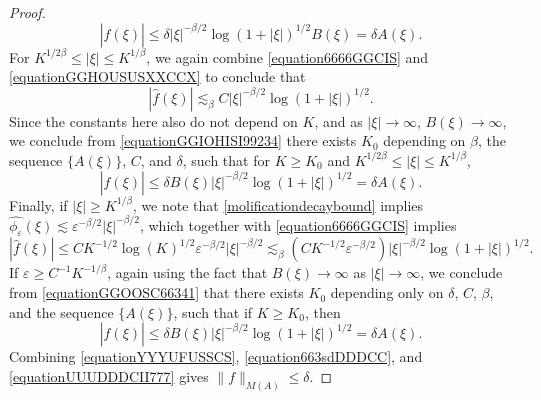 \documentclass[12pt,reqno]{article}
\numberwithin{equation}{section}
\begin{document}
\begin{proof}
    \begin{equation} \label{equationYYYUFUSSCS}
        |\widehat{f}(\xi)| \leq \delta |\xi|^{-\beta/2} \log(1 + |\xi|)^{1/2} B(\xi) = \delta A(\xi).
    \end{equation}
    For $K^{1/2\beta} \leq |\xi| \leq K^{1/\beta}$, we again combine \eqref{equation6666GGCIS} and \eqref{equationGGHOUSUSXXCCX} to conclude that
    \begin{equation} \label{equationGGIOHISI99234}
        |\widehat{f}(\xi)| \lesssim_\beta C |\xi|^{-\beta/2} \log(1 + |\xi|)^{1/2}.
    \end{equation}
    Since the constants here also do not depend on $K$, and as $|\xi | \to \infty$, $B(\xi) \to \infty$, we conclude from \eqref{equationGGIOHISI99234} there exists $K_0$ depending on $\beta$, the sequence $\{ A(\xi) \}$, $C$, and $\delta$, such that for $K \geq K_0$ and $K^{1/2\beta} \leq |\xi| \leq K^{1/\beta}$,
    \begin{equation} \label{equation663sdDDDCC}
        |\widehat{f}(\xi)| \leq \delta B(\xi) |\xi|^{-\beta/2} \log(1 + |\xi|)^{1/2} = \delta A(\xi).
    \end{equation}
    Finally, if $|\xi| \geq K^{1/\beta}$, we note that \eqref{molificationdecaybound} implies $\widehat{\phi_\varepsilon}(\xi) \lesssim \varepsilon^{-\beta/2} |\xi|^{-\beta/2}$, which together with \eqref{equation6666GGCIS} implies
    \begin{equation} \label{equationGGOOSC66341}
        |\widehat{f}(\xi)| \leq C K^{-1/2} \log(K)^{1/2} \varepsilon^{-\beta/2} |\xi|^{-\beta/2} \lesssim_\beta \left( C K^{-1/2} \varepsilon^{-\beta/2} \right) |\xi|^{-\beta/2} \log(1 + |\xi|)^{1/2}.
    \end{equation}
    If $\varepsilon \geq C^{-1} K^{-1/\beta}$, again using the fact that $B(\xi) \to \infty$ as $|\xi| \to \infty$, we conclude from \eqref{equationGGOOSC66341} that there exists $K_0$ depending only on $\delta$, $C$, $\beta$, and the sequence $\{ A(\xi) \}$, such that if $K \geq K_0$, then
    \begin{equation} \label{equationUUUDDDCII777}
        |\widehat{f}(\xi)| \leq \delta B(\xi) |\xi|^{-\beta/2} \log(1 + |\xi|)^{1/2} = \delta A(\xi).
    \end{equation}
    Combining \eqref{equationYYYUFUSSCS}, \eqref{equation663sdDDDCC}, and \eqref{equationUUUDDDCII777} gives $\| f \|_{M(A)} \leq \delta$.
\end{proof}
\end{document}
